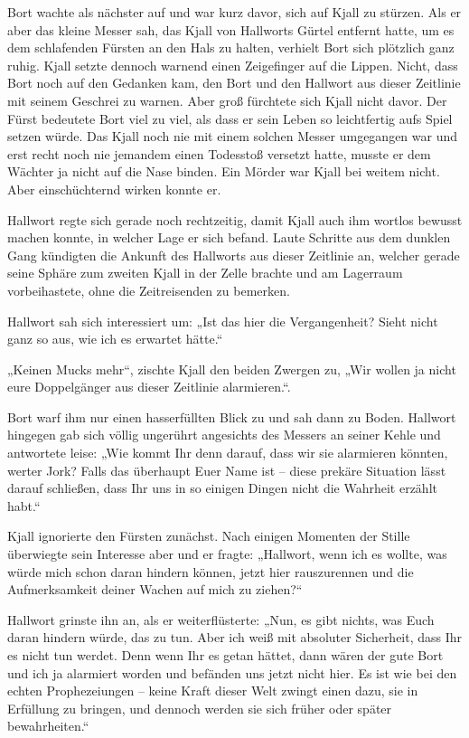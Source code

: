 \documentclass[10pt, a4paper, oneside]{book}
\begin{document}
Bort wachte als nächster auf und war kurz davor, sich auf Kjall zu stürzen. Als er aber das kleine Messer sah, das Kjall von Hallworts Gürtel entfernt hatte, um es dem schlafenden Fürsten an den Hals zu halten, verhielt Bort sich plötzlich ganz ruhig. Kjall setzte dennoch warnend einen Zeigefinger auf die Lippen. Nicht, dass Bort noch auf den Gedanken kam, den Bort und den Hallwort aus dieser Zeitlinie mit seinem Geschrei zu warnen. Aber groß fürchtete sich Kjall nicht davor. Der Fürst bedeutete Bort viel zu viel, als dass er sein Leben so leichtfertig aufs Spiel setzen würde. Das Kjall noch nie mit einem solchen Messer umgegangen war und erst recht noch nie jemandem einen Todesstoß versetzt hatte, musste er dem Wächter ja nicht auf die Nase binden. Ein Mörder war Kjall bei weitem nicht. Aber einschüchternd wirken konnte er.

Hallwort regte sich gerade noch rechtzeitig, damit Kjall auch ihm wortlos bewusst machen konnte, in welcher Lage er sich befand. Laute Schritte aus dem dunklen Gang kündigten die Ankunft des Hallworts aus dieser Zeitlinie an, welcher gerade seine Sphäre zum zweiten Kjall in der Zelle brachte und am Lagerraum vorbeihastete, ohne die Zeitreisenden zu bemerken.

Hallwort sah sich interessiert um: „Ist das hier die Vergangenheit? Sieht nicht ganz so aus, wie ich es erwartet hätte.“

„Keinen Mucks mehr“, zischte Kjall den beiden Zwergen zu, „Wir wollen ja nicht eure Doppelgänger aus dieser Zeitlinie alarmieren.“.

Bort warf ihm nur einen hasserfüllten Blick zu und sah dann zu Boden. Hallwort hingegen gab sich völlig ungerührt angesichts des Messers an seiner Kehle und antwortete leise: „Wie kommt Ihr denn darauf, dass wir sie alarmieren könnten, werter Jork? Falls das überhaupt Euer Name ist – diese prekäre Situation lässt darauf schließen, dass Ihr uns in so einigen Dingen nicht die Wahrheit erzählt habt.“

Kjall ignorierte den Fürsten zunächst. Nach einigen Momenten der Stille überwiegte sein Interesse aber und er fragte: „Hallwort, wenn ich es wollte, was würde mich schon daran hindern können, jetzt hier rauszurennen und die Aufmerksamkeit deiner Wachen auf mich zu ziehen?“

Hallwort grinste ihn an, als er weiterflüsterte: „Nun, es gibt nichts, was Euch daran hindern würde, das zu tun. Aber ich weiß mit absoluter Sicherheit, dass Ihr es nicht tun werdet. Denn wenn Ihr es getan hättet, dann wären der gute Bort und ich ja alarmiert worden und befänden uns jetzt nicht hier. Es ist wie bei den echten Prophezeiungen – keine Kraft dieser Welt zwingt einen dazu, sie in Erfüllung zu bringen, und dennoch werden sie sich früher oder später bewahrheiten.“
\end{document}

